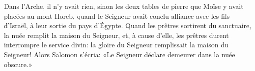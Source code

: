 Dans l’Arche, il n’y avait rien,
	sinon les deux tables de pierre que Moïse y avait placées au mont Horeb,
	quand le Seigneur avait conclu alliance avec les fils d’Israël,
	à leur sortie du pays d’Égypte.
Quand les prêtres sortirent du sanctuaire, la nuée remplit la maison du Seigneur,
	et, à cause d’elle, les prêtres durent interrompre le service divin:
	la gloire du Seigneur remplissait la maison du Seigneur!
Alors Salomon s’écria: «Le Seigneur déclare demeurer dans la nuée obscure.»

